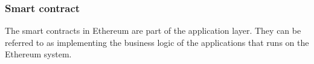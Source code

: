 \subsubsection{Smart contract}
\label{sec:smart-contract}

The smart contracts in Ethereum are part of the application layer. They can be
referred to as implementing the business logic of the applications that runs on
the Ethereum system.



